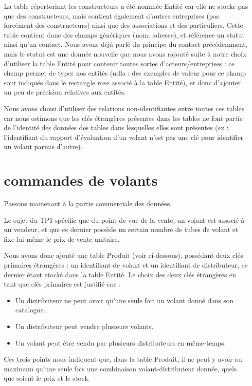 \documentclass[french,a4paper,12pt]{report}
\begin{document}
La table répertoriant les constructeurs a été nommée Entité car elle ne stocke
pas que des constructeurs, mais contient également d'autres entreprises (pas
forcément des constructeurs) ainsi que des associations et des particuliers.
Cette table contient donc des champs génériques (nom, adresse), et référence un
 statut ainsi qu'un contact. Nous avons déjà parlé du principe du contact
 précédemment, mais le statut est une donnée nouvelle que nous avons rajouté
 suite à notre choix d'utiliser la table Entité pour contenir toutes sortes
 d'acteurs/entreprises : ce champ permet de typer nos entités (ndla : des
 exemples de valeur pour ce champ sont indiqués dans le rectangle rose associé
 à la table Entité), et donc d'ajouter un peu de précision relatives aux entités.

Nous avons choisi d'utiliser des relations non-identifiantes entre toutes ces
tables car nous estimons que les clés étrangères présentes dans les tables ne
font partie de l'identité des données des tables dans lesquelles elles sont
présentes (ex : l'identifiant du rapport d'évaluation d'un volant n'est pas
une clé pour identifier un volant parmis d'autre).

\section{commandes de volants}
Passons mainenant à la partie commerciale des données.

Le sujet du TP1 spécifie que du point de vue de la vente, un volant est associé
à un vendeur, et que ce dernier possède un certain nombre de tubes de volant et
fixe lui-même le prix de vente unitaire.

Nous avons donc ajouté une table Produit (voir ci-dessous), possédant deux clés
primaires étrangères : un identifiant de volant et un identifiant de
distributeur, ce dernier étant stocké dans la table Entité. Le choix des deux
clés étrangères en tant que clés primaires est justifié car :
\begin{itemize}
  \item Un distributeur ne peut avoir qu'une seule foit un volant donné dans
  son catalogue.
  \item Un distributeur peut vendre plusieurs volants.
  \item Un volant peut être vendu par plusieurs distributeurs en même-temps.
\end{itemize}
Ces trois points nous indiquent que, dans la table Produit, il ne peut y avoir
au maximum qu'une seule fois une combinaison volant-distributeur donnée, quels
que soient le prix et le stock.
\end{document}
